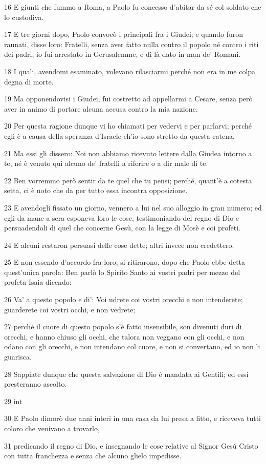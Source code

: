 \par 16 E giunti che fummo a Roma, a Paolo fu concesso d'abitar da sé col soldato che lo custodiva.
\par 17 E tre giorni dopo, Paolo convocò i principali fra i Giudei; e quando furon raunati, disse loro: Fratelli, senza aver fatto nulla contro il popolo né contro i riti dei padri, io fui arrestato in Gerusalemme, e di là dato in man de' Romani.
\par 18 I quali, avendomi esaminato, volevano rilasciarmi perché non era in me colpa degna di morte.
\par 19 Ma opponendovisi i Giudei, fui costretto ad appellarmi a Cesare, senza però aver in animo di portare alcuna accusa contro la mia nazione.
\par 20 Per questa ragione dunque vi ho chiamati per vedervi e per parlarvi; perché egli è a causa della speranza d'Israele ch'io sono stretto da questa catena.
\par 21 Ma essi gli dissero: Noi non abbiamo ricevuto lettere dalla Giudea intorno a te, né è venuto qui alcuno de' fratelli a riferire o a dir male di te.
\par 22 Ben vorremmo però sentir da te quel che tu pensi; perché, quant'è a cotesta setta, ci è noto che da per tutto essa incontra opposizione.
\par 23 E avendogli fissato un giorno, vennero a lui nel suo alloggio in gran numero; ed egli da mane a sera esponeva loro le cose, testimoniando del regno di Dio e persuadendoli di quel che concerne Gesù, con la legge di Mosè e coi profeti.
\par 24 E alcuni restaron persuasi delle cose dette; altri invece non credettero.
\par 25 E non essendo d'accordo fra loro, si ritirarono, dopo che Paolo ebbe detta quest'unica parola: Ben parlò lo Spirito Santo ai vostri padri per mezzo del profeta Isaia dicendo:
\par 26 Va' a questo popolo e di': Voi udrete coi vostri orecchi e non intenderete; guarderete coi vostri occhi, e non vedrete;
\par 27 perché il cuore di questo popolo s'è fatto insensibile, son divenuti duri di orecchi, e hanno chiuso gli occhi, che talora non veggano con gli occhi, e non odano con gli orecchi, e non intendano col cuore, e non si convertano, ed io non li guarisca.
\par 28 Sappiate dunque che questa salvazione di Dio è mandata ai Gentili; ed essi presteranno ascolto.
\par 29 int
\par 30 E Paolo dimorò due anni interi in una casa da lui presa a fitto, e riceveva tutti coloro che venivano a trovarlo,
\par 31 predicando il regno di Dio, e insegnando le cose relative al Signor Gesù Cristo con tutta franchezza e senza che alcuno glielo impedisse.


